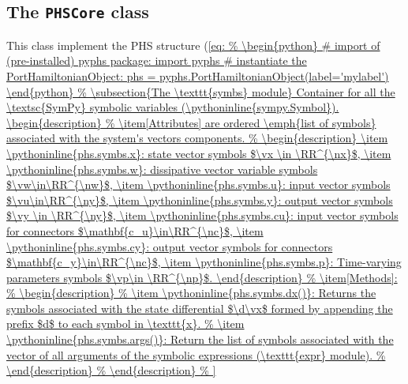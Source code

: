 \documentclass[10pt,a4paper]{article}
\begin{document}
\subsection{The \texttt{PHSCore} class}
%
This class implement the PHS structure (\ref{eq:
%
\begin{python}
# import of (pre-installed) pyphs package:
import pyphs

# instantiate the PortHamiltonianObject:
phs = pyphs.PortHamiltonianObject(label='mylabel')
\end{python}
%
\subsection{The \texttt{symbs} module} Container for all the \textsc{SymPy} symbolic variables (\pythoninline{sympy.Symbol}). 
\begin{description}
%
\item[Attributes] are ordered \emph{list of symbols} associated with the system's vectors components.
%
\begin{description}
\item \pythoninline{phs.symbs.x}: state vector symbols $\vx \in \RR^{\nx}$,
\item \pythoninline{phs.symbs.w}: dissipative vector variable symbols $\vw\in\RR^{\nw}$,
\item \pythoninline{phs.symbs.u}: input vector symbols $\vu\in\RR^{\ny}$,
\item \pythoninline{phs.symbs.y}: output vector symbols $\vy \in \RR^{\ny}$,
\item \pythoninline{phs.symbs.cu}: input vector symbols for connectors $\mathbf{c_u}\in\RR^{\nc}$,
\item \pythoninline{phs.symbs.cy}: output vector symbols for connectors $\mathbf{c_y}\in\RR^{\nc}$,
\item \pythoninline{phs.symbs.p}: Time-varying parameters symbols $\vp\in \RR^{\np}$.
\end{description}
%
\item[Methods]:
%
\begin{description}
%
\item \pythoninline{phs.symbs.dx()}: Returns the symbols associated with the state differential $\d\vx$ formed by appending the prefix $d$ to each symbol in \texttt{x}.
%
\item \pythoninline{phs.symbs.args()}: Return the list of symbols associated with the vector of all arguments of the symbolic expressions (\texttt{expr} module).
%
\end{description}
%
\end{description}
%
}
\end{document}
